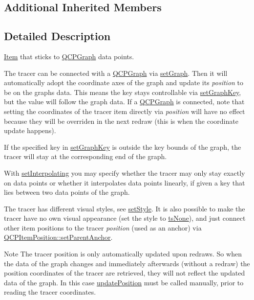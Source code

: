 \subsection*{Additional Inherited Members}


\subsection{Detailed Description}
\hyperlink{class_item}{Item} that sticks to \hyperlink{class_q_c_p_graph}{Q\+C\+P\+Graph} data points. 

 The tracer can be connected with a \hyperlink{class_q_c_p_graph}{Q\+C\+P\+Graph} via \hyperlink{class_q_c_p_item_tracer_af5886f4ded8dd68cb4f3388f390790c0}{set\+Graph}. Then it will automatically adopt the coordinate axes of the graph and update its {\itshape position} to be on the graph\textquotesingle{}s data. This means the key stays controllable via \hyperlink{class_q_c_p_item_tracer_a6840143b42f3b685cedf7c6d83a704c8}{set\+Graph\+Key}, but the value will follow the graph data. If a \hyperlink{class_q_c_p_graph}{Q\+C\+P\+Graph} is connected, note that setting the coordinates of the tracer item directly via {\itshape position} will have no effect because they will be overriden in the next redraw (this is when the coordinate update happens).

If the specified key in \hyperlink{class_q_c_p_item_tracer_a6840143b42f3b685cedf7c6d83a704c8}{set\+Graph\+Key} is outside the key bounds of the graph, the tracer will stay at the corresponding end of the graph.

With \hyperlink{class_q_c_p_item_tracer_a6c244a9d1175bef12b50afafd4f5fcd2}{set\+Interpolating} you may specify whether the tracer may only stay exactly on data points or whether it interpolates data points linearly, if given a key that lies between two data points of the graph.

The tracer has different visual styles, see \hyperlink{class_q_c_p_item_tracer_a41a2ac4f1acd7897b4e2a2579c03204e}{set\+Style}. It is also possible to make the tracer have no own visual appearance (set the style to \hyperlink{class_q_c_p_item_tracer_a2f05ddb13978036f902ca3ab47076500af543193a0b17ac133beb26152292f6b6}{ts\+None}), and just connect other item positions to the tracer {\itshape position} (used as an anchor) via \hyperlink{class_q_c_p_item_position_ac094d67a95d2dceafa0d50b9db3a7e51}{Q\+C\+P\+Item\+Position\+::set\+Parent\+Anchor}.

\begin{DoxyNote}{Note}
The tracer position is only automatically updated upon redraws. So when the data of the graph changes and immediately afterwards (without a redraw) the position coordinates of the tracer are retrieved, they will not reflect the updated data of the graph. In this case \hyperlink{class_q_c_p_item_tracer_a5b90296109e36384aedbc8908a670413}{update\+Position} must be called manually, prior to reading the tracer coordinates. 
\end{DoxyNote}


